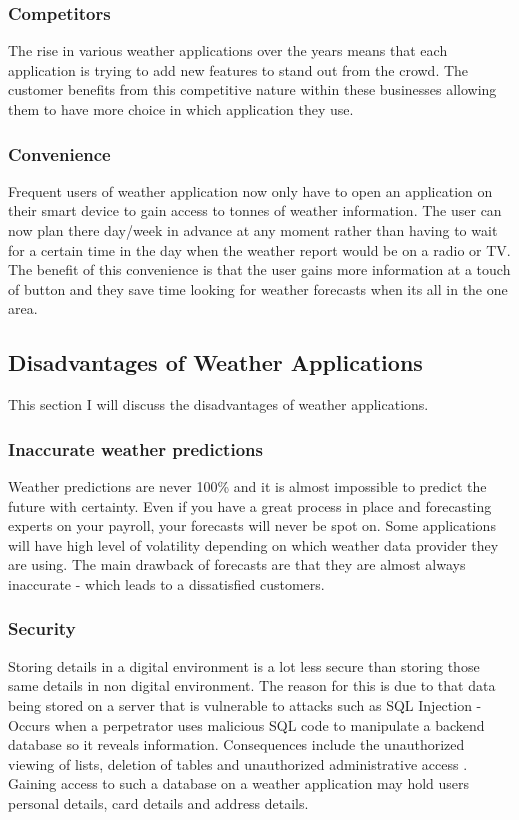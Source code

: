 \subsubsection{Competitors}

The rise in various weather applications over the years means that each application is trying to add new features to stand out from the crowd. The customer benefits from this competitive nature within these businesses allowing them to have more choice in which application they use. 
\subsubsection{Convenience}
Frequent users of weather application now only have to open an application on their smart device to gain access to tonnes of weather information. The user can now plan there day/week in advance at any moment rather than having to wait for a certain time in the day when the weather report would be on a radio or TV. The benefit of this convenience is that the user gains more information at a touch of button and they save time looking for weather forecasts when its all in the one area.

\subsection{Disadvantages of Weather Applications}
This section I will discuss the disadvantages of weather applications.

\subsubsection{Inaccurate weather predictions}

Weather predictions are never 100\% and it is almost impossible to predict the future with certainty. Even if you have a great process in place and forecasting experts on your payroll, your forecasts will never be spot on. Some applications will have high level of volatility depending on which weather data provider they are using. The main drawback of forecasts are that they are almost always inaccurate - which leads to a dissatisfied customers.

\subsubsection{Security}

Storing details in a digital environment is a lot less secure than storing those same details in non digital environment. The reason for this is due to that data being stored on a server that is vulnerable to attacks such as SQL Injection - Occurs when a perpetrator uses malicious SQL code to manipulate a backend database so it reveals information. Consequences include the unauthorized viewing of lists, deletion of tables and unauthorized administrative access \cite{sqlInjection}. Gaining access to such a database on a weather application may hold users personal details, card details and address details.


